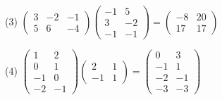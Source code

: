 \documentclass[fleqn]{jsarticle}
\begin{document}
\begin{description}
\begin{spacing}{1.2}
            \item[(3)]
                $ \left(
                    \begin{array}{ccc}
                        3 & -2 & -1 \\
                        5 & 6 & -4
                    \end{array}
                \right)
                \left(
                    \begin{array}{cc}
                        -1 & 5 \\
                        3 & -2 \\
                        -1 & -1
                    \end{array}
                \right)
                =
                \left(
                    \begin{array}{cc}
                        -8 & 20 \\
                        17 & 17
                    \end{array}
                \right) $ \\

            \item[(4)]
                $ \left(
                    \begin{array}{cc}
                        1 & 2 \\
                        0 & 1 \\
                        -1 & 0 \\
                        -2 & -1
                    \end{array}
                \right)
                \left(
                    \begin{array}{cc}
                        2 & 1 \\
                        -1 & 1
                    \end{array}
                \right)
                =
                \left(
                    \begin{array}{cc}
                        0 & 3 \\
                        -1 & 1 \\
                        -2 & -1 \\
                        -3 & -3
                    \end{array}
                \right) $ \\


\end{spacing}
\end{description}
\end{document}
